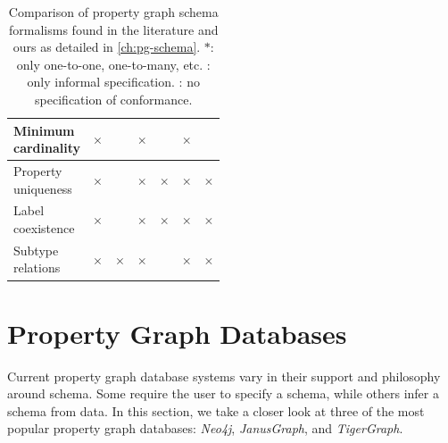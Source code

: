 \documentclass{report}
\theoremstyle{definition}
\newcommand{\yes}{\cellcolor{lightgreen}\color{green}\checkmark}
\newcommand{\no}{\cellcolor{lightred}\color{red}$\times$}
\begin{document}
\begin{table}[t]
\begin{tabular}{lcccccc}
    \hline
    \makecell[l]{Minimum                                                                                                                                                                        \\cardinality}     & \no                & \yes                 & \no                 & \yes*                 & \no          & \yes \\
    \hline
    \makecell[l]{Property                                                                                                                                                                       \\uniqueness}    & \no               & \yes                & \no                 & \no                & \no           & \no \\
    \hline
    \makecell[l]{Label                                                                                                                                                                          \\coexistence} & \no                & \yes                & \no                 & \no                 & \no           & \no \\
    \hline
    \makecell[l]{Subtype                                                                                                                                                                        \\relations} & \no                & \no                 & \no                 & \yes                 & \no           & \no \\
    \hline
  \end{tabular}
  \caption[Comparison of property graph schema formalisms found in the literature and ours]{Comparison of property graph schema formalisms found in the literature and ours as detailed in \autoref{ch:pg-schema}. $*$: only one-to-one, one-to-many, etc. \textdagger: only informal specification. {\footnotesize \textdaggerdbl}: no specification of conformance.}
  \label{tab:pg-schema-literature}
\end{table}

\section{Property Graph Databases}

Current property graph database systems vary in their support and philosophy around schema. Some require the user to specify a schema, while others infer a schema from data. In this section, we take a closer look at three of the most popular property graph databases: \emph{Neo4j}, \emph{JanusGraph}, and \emph{TigerGraph}.
\end{document}
